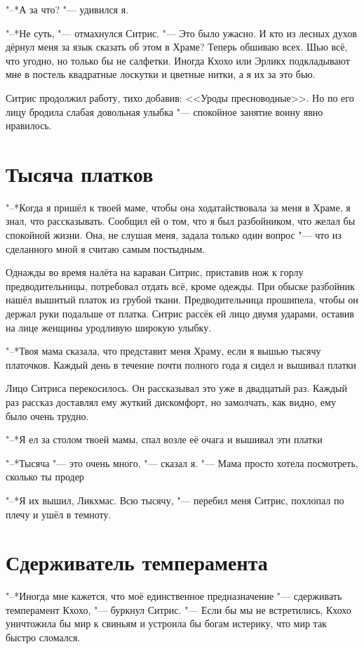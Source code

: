 \documentclass[a4paper,10pt]{book}
\newcommand{\mulang}[3]{#2}%
\newcommand{\ldotst}{\so{...}\xspace}
\begin{document}
"--*А за что? "--- удивился я.

"--*Не суть, "--- отмахнулся Ситрис. "--- Это было ужасно. И кто из лесных 
духов дёрнул меня за язык сказать об этом в Храме? Теперь обшиваю всех. Шью 
всё, что угодно, но только бы не салфетки. Иногда Кхохо или Эрликх подкладывают 
мне в постель квадратные лоскутки и цветные нитки, а я их за это бью.

Ситрис продолжил работу, тихо добавив: <<Уроды пресноводные>>. Но по его лицу 
бродила слабая довольная улыбка "--- спокойное занятие воину явно нравилось.

\section{Тысяча платков}

"--*Когда я пришёл к твоей маме, чтобы она ходатайствовала за меня в Храме, я 
знал, что рассказывать. Сообщил ей о том, что я был разбойником, что желал бы 
спокойной жизни. Она, не слушая меня, задала только один вопрос "--- что из 
сделанного мной я считаю самым постыдным.

Однажды во время налёта на караван Ситрис, приставив нож к горлу 
предводительницы, потребовал отдать всё, кроме одежды. При обыске разбойник 
нашёл вышитый платок из грубой ткани. Предводительница прошипела, чтобы он 
держал руки подальше от платка. Ситрис рассёк ей лицо двумя ударами, оставив на 
лице женщины уродливую широкую улыбку.

"--*Твоя мама сказала, что представит меня Храму, если я вышью тысячу 
платочков. Каждый день в течение почти полного года я сидел и вышивал 
платки\ldotst

Лицо Ситриса перекосилось. Он рассказывал это уже в двадцатый раз. Каждый раз 
рассказ доставлял ему жуткий дискомфорт, но замолчать, как видно, ему было 
очень трудно.

"--*Я ел за столом твоей мамы, спал возле её очага и вышивал эти платки\ldotst

"--*Тысяча "--- это очень много, "--- сказал я. "--- Мама просто хотела 
посмотреть, сколько ты продер\ldotst

"--*Я их вышил, Ликхмас. Всю тысячу, "--- перебил меня Ситрис, похлопал по 
плечу и ушёл в темноту.

\section{Сдерживатель темперамента}

\mulang{}{"--*Иногда мне кажется, что моё единственное предназначение "--- 
сдерживать темперамент Кхохо, "--- буркнул Ситрис. "---}
{``Sometimes it seems my only destiny is to restrain Kchoho's temperament,'' 
Sitris grumbled.}
\mulang{}{Если бы мы не встретились, Кхохо уничтожила бы мир к свиньям и 
устроила бы богам истерику, что мир так быстро сломался.}
{``If we hadn't met, Kchoho would have destroyed the world and made an uproar 
to gods because it wasn't stable enough.''}
\end{document}
